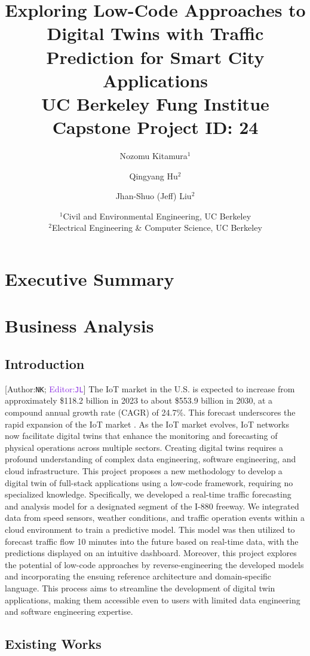 \documentclass{report}
\title{{\bf Exploring Low-Code Approaches to Digital Twins with Traffic Prediction for Smart City Applications} \\ \medskip \Large UC Berkeley Fung Institue Capstone Project ID: 24}
\author{Nozomu Kitamura$^1$ \and Qingyang Hu$^2$ \and Jhan-Shuo (Jeff) Liu$^2$}
\date{%
    $^1$Civil and Environmental Engineering, UC Berkeley\\%
    $^2$Electrical Engineering \& Computer Science, UC Berkeley\\[1ex]%
    \bigskip {\it \today}
}
\begin{document}
\newcommand{\integrity}[2]{[\textcolor{Sepia}{Author:{\tt#1}}; \textcolor{BlueViolet}{Editor:{\tt#2}}]}

\maketitle
\newpage
\tableofcontents


\newpage
\doublespacing
\chapter{Executive Summary}
\chapter{Business Analysis}

\section{Introduction}
\integrity{NK}{JL} The IoT market in the U.S. is expected to increase from approximately \$118.2 billion in 2023 to about \$553.9 billion in 2030, at a compound annual growth rate (CAGR) of 24.7\%. This forecast underscores the rapid expansion of the IoT market \autocite{fortune2020us}. As the IoT market evolves, IoT networks now facilitate digital twins that enhance the monitoring and forecasting of physical operations across multiple sectors. Creating digital twins requires a profound understanding of complex data engineering, software engineering, and cloud infrastructure. This project proposes a new methodology to develop a digital twin of full-stack applications using a low-code framework, requiring no specialized knowledge. Specifically, we developed a real-time traffic forecasting and analysis model for a designated segment of the I-880 freeway. We integrated data from speed sensors, weather conditions, and traffic operation events within a cloud environment to train a predictive model. This model was then utilized to forecast traffic flow 10 minutes into the future based on real-time data, with the predictions displayed on an intuitive dashboard. Moreover, this project explores the potential of low-code approaches by reverse-engineering the developed models and incorporating the ensuing reference architecture and domain-specific language. This process aims to streamline the development of digital twin applications, making them accessible even to users with limited data engineering and software engineering expertise.

\section{Existing Works}
\end{document}
